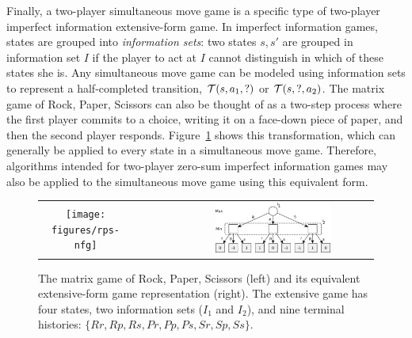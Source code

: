 Finally, a two-player simultaneous move game is a specific type of two-player imperfect information extensive-form game.
In imperfect information
games, states are grouped into {\it information sets}: two states $s, s'$ are grouped in information set $I$ if the player
to act at $I$ cannot distinguish in which of these states she is. Any simultaneous move game can be modeled
using information sets to represent a half-completed transition, \ie $\mathcal{T}(s, a_1, ?)$ or $\mathcal{T}(s, ?, a_2)$.
The matrix game of Rock, Paper, Scissors can also be thought of as a two-step process where the first player commits
to a choice, writing it on a face-down piece of paper, and then the second player responds. Figure~\ref{fig:rps-equiv} shows this
transformation, which can generally be applied to every state in a simultaneous move game.
Therefore, algorithms intended for two-player zero-sum imperfect information games may also be applied to the
simultaneous move game using this equivalent form.

\begin{figure}
\begin{center}
\begin{tabular}{ccc}
\texttt{[image: figures/rps-nfg]} & ~~~~~ & \includegraphics[width=0.6\textwidth]{figures/rps-new} \\
\end{tabular}
\end{center}
\caption{The matrix game of Rock, Paper, Scissors (left) and its equivalent extensive-form game representation (right). The extensive
game has four states, two information sets ($I_1$ and $I_2$),
and nine terminal histories: $\{ Rr, Rp, Rs, Pr, Pp, Ps, Sr, Sp, Ss \}$. \label{fig:rps-equiv}}
\end{figure}


